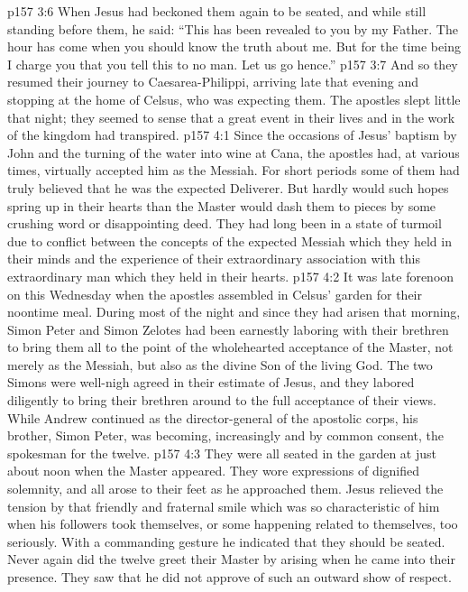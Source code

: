 \vs p157 3:6 When Jesus had beckoned them again to be seated, and while still standing before them, he said: \textcolor{ubdarkred}{“This has been revealed to you by my Father. The hour has come when you should know the truth about me. But for the time being I charge you that you tell this to no man. Let us go hence.”}
\vs p157 3:7 And so they resumed their journey to Caesarea\hyp{}Philippi, arriving late that evening and stopping at the home of Celsus, who was expecting them. The apostles slept little that night; they seemed to sense that a great event in their lives and in the work of the kingdom had transpired.
\vs p157 4:1 Since the occasions of Jesus’ baptism by John and the turning of the water into wine at Cana, the apostles had, at various times, virtually accepted him as the Messiah. For short periods some of them had truly believed that he was the expected Deliverer. But hardly would such hopes spring up in their hearts than the Master would dash them to pieces by some crushing word or disappointing deed. They had long been in a state of turmoil due to conflict between the concepts of the expected Messiah which they held in their minds and the experience of their extraordinary association with this extraordinary man which they held in their hearts.
\vs p157 4:2 It was late forenoon on this Wednesday when the apostles assembled in Celsus’ garden for their noontime meal. During most of the night and since they had arisen that morning, Simon Peter and Simon Zelotes had been earnestly laboring with their brethren to bring them all to the point of the wholehearted acceptance of the Master, not merely as the Messiah, but also as the divine Son of the living God. The two Simons were well\hyp{}nigh agreed in their estimate of Jesus, and they labored diligently to bring their brethren around to the full acceptance of their views. While Andrew continued as the director\hyp{}general of the apostolic corps, his brother, Simon Peter, was becoming, increasingly and by common consent, the spokesman for the twelve.
\vs p157 4:3 They were all seated in the garden at just about noon when the Master appeared. They wore expressions of dignified solemnity, and all arose to their feet as he approached them. Jesus relieved the tension by that friendly and fraternal smile which was so characteristic of him when his followers took themselves, or some happening related to themselves, too seriously. With a commanding gesture he indicated that they should be seated. Never again did the twelve greet their Master by arising when he came into their presence. They saw that he did not approve of such an outward show of respect.

